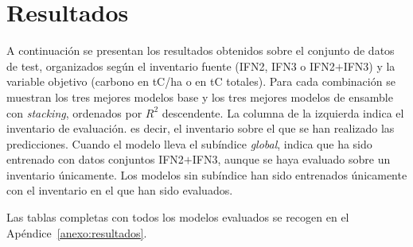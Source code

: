 \section{Resultados}
\label{sec:resultados}

A continuación se presentan los resultados obtenidos sobre el conjunto de datos de test, organizados según el inventario fuente (IFN2, IFN3 o IFN2$+$IFN3) y la variable objetivo (carbono en tC/ha o en tC totales). Para cada combinación se muestran los tres mejores modelos base y los tres mejores modelos de ensamble con \textit{stacking}, ordenados por $R^2$ descendente. La columna de la izquierda indica el inventario de evaluación. es decir, el inventario sobre el que se han realizado las predicciones. Cuando el modelo lleva el subíndice \textit{global}, indica que ha sido entrenado con datos conjuntos IFN2$+$IFN3, aunque se haya evaluado sobre un inventario únicamente. Los modelos sin subíndice han sido entrenados únicamente con el inventario en el que han sido evaluados.


Las tablas completas con todos los modelos evaluados se recogen en el Apéndice~\ref{anexo:resultados}.

